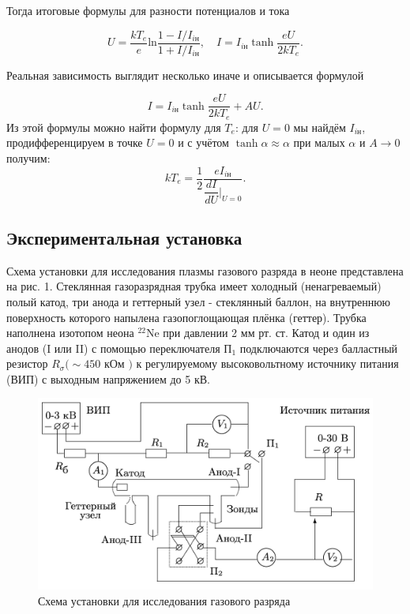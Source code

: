 \documentclass[12pt,a4paper]{article}
\begin{document}
Тогда итоговые формулы для разности потенциалов и тока

\begin{equation}
    U = \frac{kT_e}{e}\text{ln}\frac{1 - I/I_{iн}}{1 + I/I_{iн}}, \quad
    I = I_{iн} \tanh\dfrac{eU}{2kT_e}.
\end{equation}

Реальная зависимость выглядит несколько иначе и описывается формулой 

\begin{equation}
    I = I_{iн} \tanh\frac{eU}{2kT_e} + AU.
\end{equation}
Из этой формулы можно найти формулу для $T_e$: для $U=0$ мы найдём $I_{iн}$, продифференцируем в точке $U=0$ и с учётом $\tanh \alpha \approx \alpha$ при малых $\alpha$ и $A\rightarrow 0$ получим:
\begin{equation}
    kT_e = \dfrac{1}{2}\dfrac{eI_{iн}}{\dfrac{dI}{dU}|_{U=0}}.
\end{equation}

\subsection*{Экспериментальная установка}
Схема установки для исследования плазмы газового разряда в неоне представлена на рис. 1. 
Стеклянная газоразрядная трубка имеет холодный (ненагреваемый) полый катод, три анода и геттерный узел - стеклянный баллон, на внутреннюю поверхность которого напылена газопоглощающая плёнка (геттер). 
Трубка наполнена изотопом неона ${}^{22}$Ne при давлении 2 мм рт. ст. 
Катод и один из анодов (I или II) с помощью переключателя $П_1$ подключаются через балластный резистор $R_{\sigma}(\sim 450$ кОм $)$ к регулируемому высоковольтному источнику питания (ВИП) с выходным напряжением до 5 кВ.
\begin{figure}[H]
    \centering
    \includegraphics[width=0.7\linewidth]{pics/scheme.png}
    \caption{Схема установки для исследования газового разряда}
\end{figure}
\end{document}
